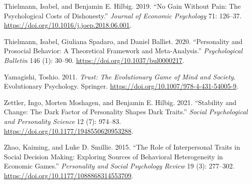 \documentclass[
]{article}
\newlength{\cslhangindent}
\newenvironment{CSLReferences}[2] %
 {\begin{list}{}{%
  \setlength{\itemindent}{0pt}
  \setlength{\leftmargin}{0pt}
  \setlength{\parsep}{0pt}
  \ifodd #1
   \setlength{\leftmargin}{\cslhangindent}
   \setlength{\itemindent}{-1\cslhangindent}
  \fi
  \setlength{\itemsep}{#2\baselineskip}}}
 {\end{list}}
\begin{document}
\begin{CSLReferences}{1}{1}
Thielmann, Isabel, and Benjamin E. Hilbig. 2019. {``No Gain Without Pain: {The} Psychological Costs of Dishonesty.''} \emph{Journal of Economic Psychology} 71: 126--37. \url{https://doi.org/10.1016/j.joep.2018.06.001}.

Thielmann, Isabel, Giuliana Spadaro, and Daniel Balliet. 2020. {``Personality and Prosocial Behavior: A Theoretical Framework and Meta-Analysis.''} \emph{Psychological Bulletin} 146 (1): 30--90. \url{https://doi.org/10.1037/bul0000217}.

Yamagishi, Toshio. 2011. \emph{Trust: The Evolutionary Game of Mind and Society}. Evolutionary Psychology. Springer. \url{https://doi.org/10.1007/978-4-431-54005-9}.

Zettler, Ingo, Morten Moshagen, and Benjamin E. Hilbig. 2021. {``Stability and Change: {The} {Dark Factor of Personality} Shapes Dark Traits.''} \emph{Social Psychological and Personality Science} 12 (7): 974--83. \url{https://doi.org/10.1177/1948550620953288}.

Zhao, Kaiming, and Luke D. Smillie. 2015. {``The Role of Interpersonal Traits in Social Decision Making: {Exploring} Sources of Behavioral Heterogeneity in Economic Games.''} \emph{Personality and Social Psychology Review} 19 (3): 277--302. \url{https://doi.org/10.1177/1088868314553709}.

\end{CSLReferences}
\end{document}
